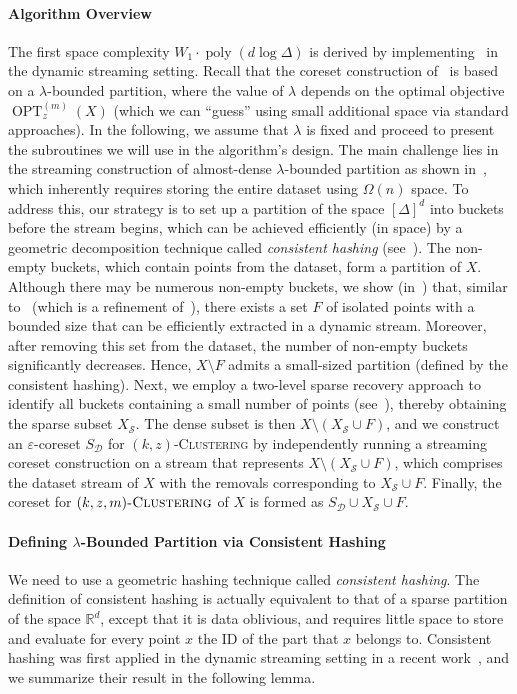 \documentclass[letterpaper,11pt]{article}
\theoremstyle{plain}
\theoremstyle{definition}
\theoremstyle{remark}
\DeclareMathOperator{\poly}{poly}
\DeclareMathOperator{\OPT}{OPT}
\renewcommand{\epsilon}{\varepsilon}
\newcommand{\calD}{\mathcal{D}}
\newcommand{\calS}{\mathcal{S}}
\newcommand{\ProblemName}[1]{\textsc{#1}}
\newcommand{\kzC}{\ProblemName{$(k,z)$-Clustering}\xspace}
\newcommand{\kzmC}{\ProblemName{$(k,z,m)$-Clustering}\xspace}
\begin{document}
\paragraph{Algorithm Overview}
The first space complexity $W_1\cdot \poly(d\log\Delta)$ is derived by implementing~ in the dynamic streaming setting.
Recall that the coreset construction of~ is based on a $\lambda$-bounded partition, where the value of $\lambda$ depends on the optimal objective $\OPT_z^{(m)}(X)$ (which we can ``guess'' using small additional space via standard approaches).
In the following, we assume that $\lambda$ is fixed and proceed to present the subroutines we will use in the algorithm's design.
The main challenge lies in the streaming construction of almost-dense $\lambda$-bounded partition as shown in~, which inherently requires storing the entire dataset using $\Omega(n)$ space. 
To address this, our strategy is to set up a partition of the space $[\Delta]^d$ into buckets before the stream begins,
which can be achieved efficiently (in space) by a geometric decomposition technique called \emph{consistent hashing} (see~). 
The non-empty buckets, which contain points from the dataset, form a partition of $X$.
Although there may be numerous non-empty buckets, we show (in~) that, similar to~ (which is a refinement of~), there exists a set $F$ of isolated points with a bounded size that can be efficiently extracted in a dynamic stream. Moreover, after removing this set from the dataset, the number of non-empty buckets significantly decreases. Hence, $X\setminus F$ admits a small-sized partition (defined by the consistent hashing).
Next, we employ a two-level sparse recovery approach to identify all buckets containing a small number of points (see~), thereby obtaining the sparse subset $X_{\calS}$. The dense subset is then $X\setminus (X_\calS \cup F)$, and we construct an $\epsilon$-coreset $S_{\calD}$ for \kzC by independently running a streaming coreset construction on a stream that represents $X\setminus (X_{\calS} \cup F)$, which comprises the dataset stream of $X$ with the removals corresponding to $X_{\calS} \cup F$. 
Finally, the coreset for $\kzmC$ of $X$ is formed as $S_{\calD} \cup X_{\calS} \cup F$.

\paragraph{Defining $\lambda$-Bounded Partition via Consistent Hashing} 
We need to use a geometric hashing technique called \emph{consistent hashing}.
The definition of consistent hashing is actually equivalent to that of a sparse partition of the space $\mathbb{R}^d$,
except that it is data oblivious, and requires little space to store and evaluate for every point $x$ the ID of the part that $x$ belongs to. 
Consistent hashing was first applied in the dynamic streaming setting in a recent work~\cite{arxiv.2204.02095}, and we summarize their result in the following lemma.
\end{document}
